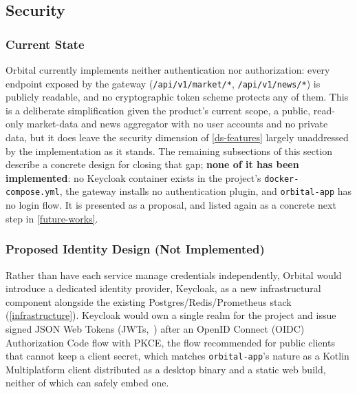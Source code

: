 \documentclass{scrartcl}
\begin{document}
\subsection{Security}\label{security}

\subsubsection{Current State}\label{security-current}

Orbital currently implements neither authentication nor authorization: every endpoint exposed by
the gateway (\texttt{/api/v1/market/*}, \texttt{/api/v1/news/*}) is publicly readable, and no
cryptographic token scheme protects any of them. This is a deliberate simplification given the
product's current scope, a public, read-only market-data and news aggregator with no user
accounts and no private data, but it does leave the security dimension of \cref{ds-features}
largely unaddressed by the implementation as it stands. The remaining subsections of this section
describe a concrete design for closing that gap; \textbf{none of it has been implemented}: no
Keycloak container exists in the project's \texttt{docker-compose.yml}, the gateway installs no
authentication plugin, and \texttt{orbital-app} has no login flow. It is presented as a proposal,
and listed again as a concrete next step in \cref{future-works}.

\subsubsection{Proposed Identity Design (Not Implemented)}\label{security-identity}

Rather than have each service manage credentials independently, Orbital would introduce a
dedicated identity provider, Keycloak, as a new infrastructural component alongside the existing
Postgres/Redis/Prometheus stack (\cref{infrastructure}). Keycloak would own a single realm for
the project and issue signed JSON Web Tokens (JWTs,~\citep{jones2015jwt}) after an OpenID Connect
(OIDC)~\citep{sakimura2014oidc} Authorization Code flow with PKCE, the flow recommended for
public clients that cannot keep a client secret, which matches \texttt{orbital-app}'s nature as a
Kotlin Multiplatform client distributed as a desktop binary and a static web build, neither of
which can safely embed one.
\end{document}

